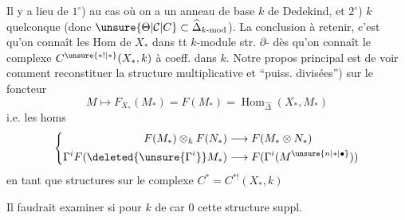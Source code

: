 Il y a lieu de 
$1^\circ$) au cas où on a un anneau
de base $k$ de Dedekind,
et $2^\circ$)  $k$ quelconque 
(donc $\unsure{\Theta|\mathcal C|C}\subset\widehat\Delta_{k\text{-}\mathrm{mod}}$). La 
conclusion à retenir, c'est
qu'on connaît les Hom de
$X_*$ dans tt $k$-module str.
$\partial$- dès qu'on connaît
le complexe  $C^{\unsure{*!|*}}(X_*,k)$ à coeff. dans
$k$. Notre propos principal
est de voir comment reconstituer
la structure multiplicative
et ``puiss. divisées'') sur le
foncteur
\[
 M\mapsto F_{X_*}(M_*)=F(M_*)=\operatorname{Hom}_{\widehat\Delta}(X_*,M_*)
\]
i.e. les homs
\[
 \left\{\begin{aligned}
 F(M_*)\otimes_k F(N_*)&\longrightarrow F(M_*\otimes N_*)\\
 \Gamma^i F(\deleted{\unsure{\Gamma^i}}M_*)&\longrightarrow F(\Gamma^i(M^{\unsure{n|*|\bullet}}))
 \end{aligned}\right.
\]
en tant que  structures
sur le complexe  $C^*=C^{*!}(X_*,k)$

Il faudrait examiner si pour
$k$ de car 0  cette structure suppl.
